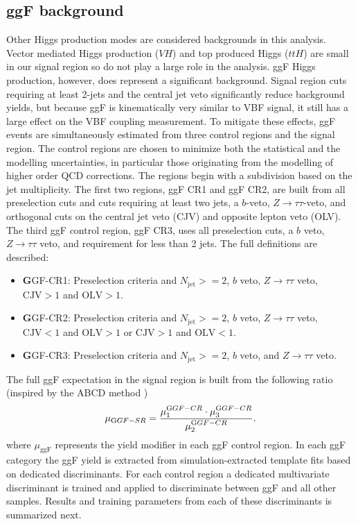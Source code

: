 \subsection{ggF background}
Other Higgs production modes are considered backgrounds in this analysis. Vector mediated Higgs production ($VH$) and top produced Higgs ($ttH$) are small in our signal region so do not play a large role in the analysis. ggF Higgs production, however, does represent a significant background. Signal region cuts requiring at least 2-jets and the central jet veto significantly reduce background yields, but because ggF is kinematically very similar to VBF signal, it still has a large effect on the VBF coupling measurement. To mitigate these effects, ggF events are simultaneously estimated from three control regions and the signal region. The control regions are chosen to minimize both the statistical and the modelling uncertainties, in particular those originating from the modelling of higher order QCD corrections. The regions begin with a subdivision based on the jet multiplicity. The first two regions, ggF CR1 and ggF CR2, are built from all preselection cuts and cuts requiring at least two jets, a $b$-veto, $Z\rightarrow\tau\tau$-veto, and orthogonal cuts on the central jet veto (CJV) and opposite lepton veto (OLV). The third ggF control region, ggF CR3, uses all preselection cuts, a $b$ veto, $Z\rightarrow \tau\tau$ veto, and requirement for less than 2 jets. The full definitions are described:  
\begin{itemize} 
\item {\textbf GGF-CR1:} Preselection criteria and $N_{ \text{jet}}>=2$, $b$ veto, $Z\rightarrow\tau\tau$ veto, $\text{CJV} > 1$ and $\text{OLV} > 1$. 
\item {\textbf GGF-CR2:} Preselection criteria and $N_{ \text{jet}}>=2$, $b$ veto, $Z\rightarrow\tau\tau$ veto, $\text{CJV}<1$ and $\text{OLV}>1$ or $\text{CJV}>1$ and $\text{OLV}<1$.
\item {\textbf GGF-CR3:} Preselection criteria and $N_{ \text{jet}}>=2$, $b$ veto, and $Z\rightarrow\tau\tau$ veto. 
\end{itemize} 
The full ggF expectation in the signal region is built from the following ratio (inspired by the ABCD method \cite{ABCD}) 
\begin{equation}
	\mu_{{\text GGF-SR}} = \frac{\mu^{{\text GGF-CR}}_{1} \cdot\mu^{{\text GGF-CR}}_{3}}{ \mu^{{\text GGF-CR}}_{2}}.
\end{equation}
where $\mu_{\text{ggF}}$ represents the yield modifier in each ggF control region. In each ggF category the ggF yield is extracted from simulation-extracted template fits based on dedicated discriminants. For each control region a dedicated multivariate discriminant is trained and applied to discriminate between ggF and all other samples. Results and training parameters from each of these discriminants is summarized next.

